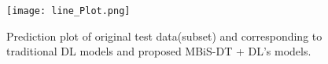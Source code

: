 \documentclass[sn-mathphys,Numbered]{sn-jnl}
\theoremstyle{thmstyleone}
\theoremstyle{thmstyletwo}
\theoremstyle{thmstylethree}
\begin{document}





\begin{figure}
    \centering
    \texttt{[image: line\_Plot.png]}
    \caption{Prediction plot of original test data(subset) and corresponding to traditional DL models and proposed MBiS-DT + DL's models.}
    \label{fig:Line plot of vs proposed MBiS-DT models}
\end{figure}
\end{document}
